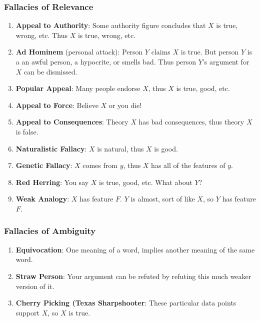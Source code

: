 \documentclass[landscape]{article}
\newcommand{\notsowide}{\setlength{\parskip}{5mm}}
\begin{document}
\subsubsection*{Fallacies of Relevance}
\begin{enumerate}%
\item \textbf{Appeal to Authority}: Some authority figure concludes that $X$ is true, wrong, etc. Thus $X$ is true, wrong, etc.

\item \textbf{Ad Hominem} (personal attack): Person $Y$ claims $X$ is true. But person $Y$ is a an awful person, a hypocrite, or smells bad. Thus person $Y$'s argument for $X$ can be dismissed.

\item \textbf{Popular Appeal}: Many people endorse $X$, thus $X$ is true, good, etc.

\item \textbf{Appeal to Force}: Believe $X$ or you die!

\item \textbf{Appeal to Consequences}: Theory $X$ has bad consequences, thus theory $X$ is false.

\item \textbf{Naturalistic Fallacy}: $X$ is natural, thus $X$ is good.

\item \textbf{Genetic Fallacy}: $X$ comes from $y$, thus $X$ has all of the features of $y$.

\item \textbf{Red Herring}: You say $X$ is true, good, etc. What about $Y$?

\item \textbf{Weak Analogy}: $X$ has feature $F$. $Y$ is almost, sort of like $X$, so $Y$ has feature $F$. 
\end{enumerate}
\subsubsection*{Fallacies of Ambiguity}
\begin{enumerate} %
\item \textbf{Equivocation}: One meaning of a word, implies another meaning of the same word.

\item \textbf{Straw Person}: Your argument can be refuted by refuting this much weaker version of it.

\item \textbf{Cherry Picking (Texas Sharpshooter}: These particular data points support $X$, so $X$ is true.


\end{enumerate}
\end{document}

